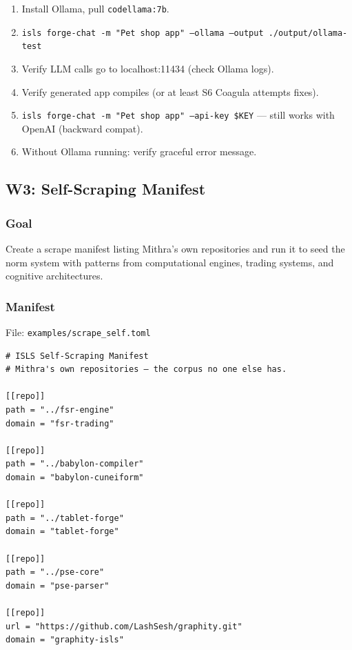 \documentclass[11pt,a4paper]{article}
\begin{document}
\begin{enumerate}[nosep]
\item Install Ollama, pull \texttt{codellama:7b}.
\item \texttt{isls forge-chat -m "Pet shop app" --ollama 
      --output ./output/ollama-test}
\item Verify LLM calls go to localhost:11434 (check Ollama logs).
\item Verify generated app compiles (or at least S6 Coagula 
      attempts fixes).
\item \texttt{isls forge-chat -m "Pet shop app" --api-key \$KEY}
      --- still works with OpenAI (backward compat).
\item Without Ollama running: verify graceful error message.
\end{enumerate}


\subsection{W3: Self-Scraping Manifest}
\label{sec:w3}

\subsubsection{Goal}

Create a scrape manifest listing Mithra's own repositories and 
run it to seed the norm system with patterns from computational 
engines, trading systems, and cognitive architectures.

\subsubsection{Manifest}

File: \texttt{examples/scrape\_self.toml}

\begin{lstlisting}[style=toml]
# ISLS Self-Scraping Manifest
# Mithra's own repositories — the corpus no one else has.

[[repo]]
path = "../fsr-engine"
domain = "fsr-trading"

[[repo]]
path = "../babylon-compiler"
domain = "babylon-cuneiform"

[[repo]]
path = "../tablet-forge"
domain = "tablet-forge"

[[repo]]
path = "../pse-core"
domain = "pse-parser"

[[repo]]
url = "https://github.com/LashSesh/graphity.git"
domain = "graphity-isls"
\end{lstlisting}
\end{document}
